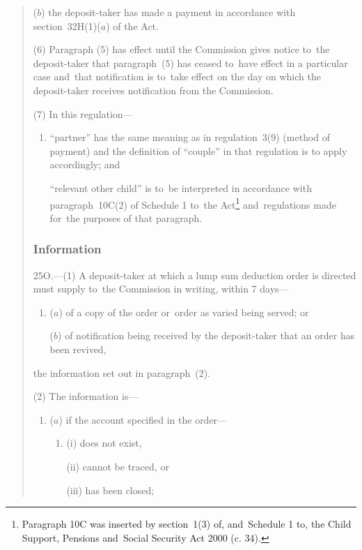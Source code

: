 \documentclass[12pt,a4paper]{article}
\begin{document}
\begin{quotation}
\begin{enumerate}
($b$) the deposit-taker has made a payment in accordance with section~32H(1)($a$)  of the Act.
\end{enumerate}

(6) Paragraph (5) has effect until the Commission gives notice to~the deposit-taker that paragraph~(5) has ceased to~have effect in a particular case and~that notification is to~take effect on the day on which the deposit-taker receives notification from the Commission.

(7) In this regulation—
\begin{enumerate}\item[]
\begin{sloppypar}
“partner” has the same meaning as in regulation~3(9) (method of payment) and the definition of “couple” in that regulation is to apply accordingly; and
\end{sloppypar}

“relevant other child” is to~be interpreted in accordance with paragraph~10C(2) of Schedule 1 to~the Act\footnote{Paragraph 10C was inserted by section~1(3) of, and~Schedule 1 to, the Child Support, Pensions and~Social Security Act 2000 (c. 34).} and~regulations made for~the purposes of that paragraph.
\end{enumerate}

\subsubsection*{Information}

25O.---(1)  A deposit-taker at which a lump sum deduction order is directed must supply to~the Commission in writing, within 7 days—
\begin{enumerate}\item[]
($a$) of a copy of the order or~order as varied being served; or

($b$) of notification being received by the deposit-taker that an order has been revived,
\end{enumerate}
the information set out in paragraph~(2).

(2) The information is—
\begin{enumerate}\item[]
($a$) if the account specified in the order—
\begin{enumerate}\item[]
(i) does not exist,

(ii) cannot be traced, or

(iii) has been closed;
\end{enumerate}


\end{enumerate}
\end{quotation}
\end{document}
